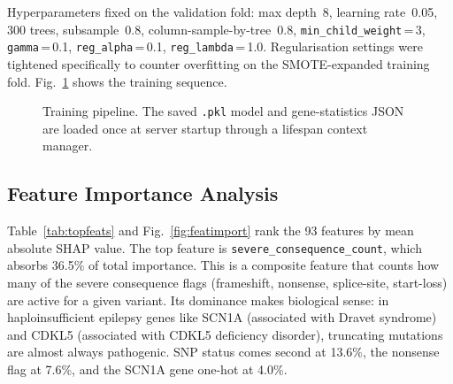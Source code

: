 \documentclass[12pt,a4paper]{article}
\begin{document}
Hyperparameters fixed on the validation fold: max depth~8, learning
rate~0.05, 300 trees, subsample~0.8, column-sample-by-tree~0.8,
\texttt{min\_child\_weight}\,=\,3, \texttt{gamma}\,=\,0.1,
\texttt{reg\_alpha}\,=\,0.1, \texttt{reg\_lambda}\,=\,1.0.
Regularisation settings were tightened specifically to counter
overfitting on the SMOTE-expanded training fold.
Fig.~\ref{fig:trainflow} shows the training sequence.

\begin{figure}[htbp]
\centering
{}
\caption{Training pipeline. The saved \texttt{.pkl} model and
         gene-statistics JSON are loaded once at server startup
         through a lifespan context manager.}
\label{fig:trainflow}
\end{figure}

\subsection{Feature Importance Analysis}

Table~\ref{tab:topfeats} and Fig.~\ref{fig:featimport} rank the 93
features by mean absolute SHAP value. The top feature is
\texttt{severe\_consequence\_count}, which absorbs 36.5\% of total
importance. This is a composite feature that counts how many of the
severe consequence flags (frameshift, nonsense, splice-site,
start-loss) are active for a given variant. Its dominance makes
biological sense: in haploinsufficient epilepsy genes like SCN1A
(associated with Dravet syndrome) and CDKL5 (associated with CDKL5
deficiency disorder), truncating mutations are almost always
pathogenic. SNP status comes second at 13.6\%, the nonsense flag at
7.6\%, and the SCN1A gene one-hot at 4.0\%.
\end{document}
